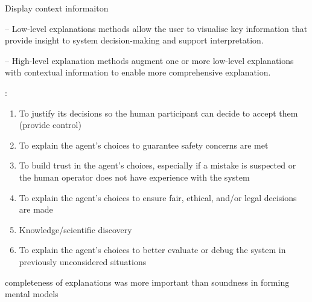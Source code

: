 Display context informaiton \cite{wiegand_id_2020}

– Low-level explanations methods allow the user to visualise key information that provide insight to system decision-making and support interpretation. \cite{martin_evaluating_2021}

– High-level explanation methods augment one or more low-level explanations with contextual information to enable more comprehensive explanation. \cite{martin_evaluating_2021}





\cite{rosenfeld_explainability_2019}:

\begin{enumerate}
    \item To justify its decisions so the human participant can decide to accept them (provide control)
    \item To explain the agent’s choices to guarantee safety concerns are met
    \item To build trust in the agent’s choices, especially if a mistake is suspected or the human operator does not have experience with the system
    \item To explain the agent’s choices to ensure fair, ethical, and/or legal decisions are made
    \item Knowledge/scientific discovery
    \item To explain the agent’s choices to better evaluate or debug the system in previously unconsidered situations
\end{enumerate}

completeness of explanations was more important than soundness in forming mental models \cite{riveiro_thats_2021}

